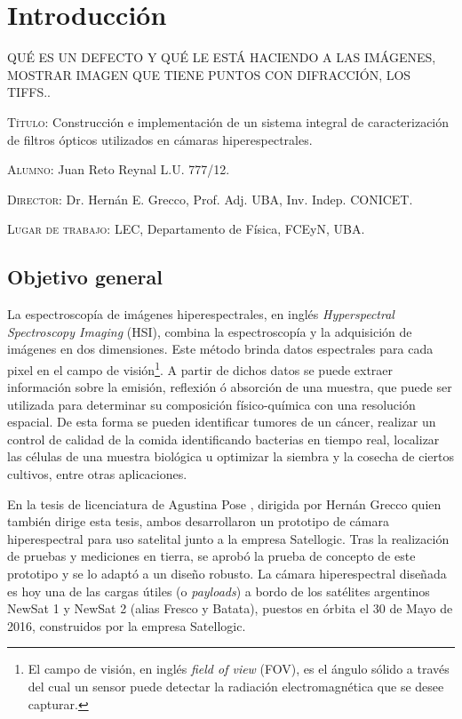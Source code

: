 \chapter{Introducción}
QUÉ ES UN DEFECTO Y QUÉ LE ESTÁ HACIENDO A LAS IMÁGENES, MOSTRAR IMAGEN QUE TIENE PUNTOS CON DIFRACCIÓN, LOS TIFFS..

\vspace{1cm}
\vspace{1cm}

\textsc{Título:} Construcción e implementación de un sistema integral de 
caracterización de filtros ópticos utilizados en cámaras hiperespectrales.


\hspace{-0.4cm}\textsc{Alumno:} Juan Reto Reynal L.U. 777/12.

\hspace{-0.4cm}\textsc{Director:} Dr. Hernán E. Grecco, 
Prof. Adj. UBA, Inv. Indep. CONICET.

\hspace{-0.4cm}\textsc{Lugar de trabajo:} LEC, Departamento de Física, FCEyN, UBA.


\section{Objetivo general}
\hspace{0.5cm}La espectroscopía de imágenes hiperespectrales, en inglés 
\textit{Hyperspectral 
Spectroscopy Imaging} (HSI), combina la espectroscopía y la adquisición de 
imágenes 
en dos dimensiones. Este método brinda datos espectrales para cada 
pixel en el campo de 
visión\footnote{El campo de visión, en inglés \textit{field of view} (FOV), es 
el ángulo sólido a través del cual un sensor puede detectar la radiación 
electromagnética que se desee capturar.}. A partir de dichos 
datos se puede extraer información sobre la emisión, reflexión ó absorción de 
una muestra, que puede ser utilizada para determinar su 
composición físico-química con una resolución espacial. De esta forma se pueden 
identificar tumores de un cáncer, realizar un control de calidad de la comida 
identificando bacterias en tiempo real, localizar las células de una muestra 
biológica u optimizar la siembra y la cosecha de ciertos cultivos, entre otras 
aplicaciones.




En la tesis de licenciatura de Agustina Pose \cite{Pose2017}, dirigida 
por 
Hernán Grecco quien también dirige esta tesis, ambos desarrollaron un prototipo 
de cámara hiperespectral para uso satelital junto a la empresa Satellogic. Tras 
la realización de pruebas y mediciones en tierra, se aprobó la 
prueba de concepto de este prototipo y se lo adaptó a un diseño robusto. La 
cámara hiperespectral diseñada es hoy una de las cargas útiles (o 
\textit{payloads}) a bordo de los satélites argentinos NewSat 1 y NewSat 2 
(alias Fresco y Batata), puestos en órbita el 30 de Mayo de 2016, construidos 
por la empresa Satellogic.

